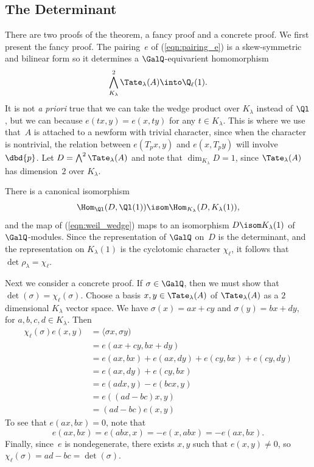 \documentclass{report}
\begin{document}
\subsection{The Determinant}\label{sec:detdet}
There are two proofs of the theorem, a fancy proof and a concrete
proof.  We first present the fancy proof. The pairing~$e$ of
(\ref{eqn:pairing_e}) is a skew-symmetric and bilinear form so it
determines a $\GalQ$-equivarient homomorphism
\begin{equation}\label{eqn:weil_wedge}
  \bigwedge^2_{K_{\lambda}}\Tate_{\lambda}(A)\into\Q_{\ell}(1).
\end{equation}
It is not {\em a priori} true that we can take the wedge product over
$K_{\lambda}$ instead of $\Ql$, but we can because $e(tx,y)=e(x,ty)$
for any $t\in{}K_{\lambda}$.  This is where we use that~$A$ is
attached to a newform with trivial character, since when the character
is nontrivial, the relation between $e(T_p x,y)$ and $e(x,T_p y)$
will involve $\dbd{p}$.  Let
$D=\bigwedge^2\Tate_{\lambda}(A)$ and note that $\dim_{K_{\lambda}}
D=1$, since $\Tate_{\lambda}(A)$ has dimension~$2$ over $K_\lambda$.

There is a canonical isomorphism
\[
  \Hom_{\Ql}(D,\Ql(1))\isom\Hom_{K_{\lambda}}(D,K_{\lambda}(1)),
\]
and the map of (\ref{eqn:weil_wedge}) maps to an isomorphism
$D\isom K_{\lambda}(1)$ of $\GalQ$-modules.
Since the representation of $\GalQ$ on~$D$ is the
determinant, and the representation on $K_{\lambda}(1)$
is the cyclotomic character $\chi_\ell$,
it follows that $\det\rho_{\lambda}=\chi_{\ell}$.

Next we consider a concrete proof.
If $\sigma\in\GalQ$, then we must show that
$\det(\sigma)=\chi_{\ell}(\sigma)$. Choose
a basis $x,y\in\Tate_{\lambda}(A)$ of $\Tate_{\lambda}(A)$
as a $2$ dimensional $K_{\lambda}$ vector space.
We have $\sigma(x)=ax+cy$ and $\sigma(y)=bx+dy$,
for $a,b,c,d\in{}K_{\lambda}$.
Then
\begin{align*}
\chi_{\ell}(\sigma)e(x,y)&=\langle\sigma{}x,\sigma{}y)\\
&=e(ax+cy,bx+dy)\\
&=e(ax,bx)+e(ax,dy)+e(cy,bx)+e(cy,dy)\\
&=e(ax,dy)+e(cy,bx)\\
&=e(adx,y)-e(bcx,y)\\
&=e((ad-bc)x,y)\\
&= (ad-bc)e(x,y)
\end{align*}
To see that $e(ax,bx)=0$, note that
\[
e(ax,bx)=e(abx,x)=
-e(x,abx)=-e(ax,bx).
\]
Finally, since~$e$ is nondegenerate, there exists $x,y$ such
that $e(x,y)\neq 0$, so $\chi_{\ell}(\sigma) = ad-bc = \det(\sigma)$.
\end{document}

